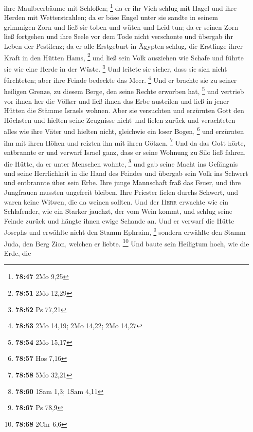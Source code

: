 ihre Maulbeerbäume mit Schloßen; \footnote{\textbf{78:47} 2Mo 9,25}
 da er ihr Vieh schlug mit Hagel und ihre Herden mit
Wetterstrahlen;  da er böse Engel unter sie sandte in
seinem grimmigen Zorn und ließ sie toben und wüten und Leid tun;
 da er seinen Zorn ließ fortgehen und ihre Seele vor dem
Tode nicht verschonte und übergab ihr Leben der Pestilenz;
 da er alle Erstgeburt in Ägypten schlug, die Erstlinge
ihrer Kraft in den Hütten Hams, \footnote{\textbf{78:51} 2Mo 12,29}
 und ließ sein Volk ausziehen wie Schafe und führte sie
wie eine Herde in der Wüste. \footnote{\textbf{78:52} Ps 77,21}
 Und leitete sie sicher, dass sie sich nicht fürchteten;
aber ihre Feinde bedeckte das Meer. \footnote{\textbf{78:53} 2Mo 14,19;
  2Mo 14,22; 2Mo 14,27}  Und er brachte sie zu seiner
heiligen Grenze, zu diesem Berge, den seine Rechte erworben hat,
\footnote{\textbf{78:54} 2Mo 15,17}  und vertrieb vor
ihnen her die Völker und ließ ihnen das Erbe austeilen und ließ in jener
Hütten die Stämme Israels wohnen.  Aber sie versuchten
und erzürnten Gott den Höchsten und hielten seine Zeugnisse nicht
 und fielen zurück und verachteten alles wie ihre Väter
und hielten nicht, gleichwie ein loser Bogen, \footnote{\textbf{78:57}
  Hos 7,16}  und erzürnten ihn mit ihren Höhen und
reizten ihn mit ihren Götzen. \footnote{\textbf{78:58} 5Mo 32,21}
 Und da das Gott hörte, entbrannte er und verwarf Israel
ganz,  dass er seine Wohnung zu Silo ließ fahren, die
Hütte, da er unter Menschen wohnte, \footnote{\textbf{78:60} 1Sam 1,3;
  1Sam 4,11}  und gab seine Macht ins Gefängnis und seine
Herrlichkeit in die Hand des Feindes  und übergab sein
Volk ins Schwert und entbrannte über sein Erbe.  Ihre
junge Mannschaft fraß das Feuer, und ihre Jungfrauen mussten ungefreit
bleiben.  Ihre Priester fielen durchs Schwert, und waren
keine Witwen, die da weinen sollten.  Und der
\textsc{Herr} erwachte wie ein Schlafender, wie ein Starker jauchzt, der
vom Wein kommt,  und schlug seine Feinde zurück und
hängte ihnen ewige Schande an.  Und er verwarf die Hütte
Josephs und erwählte nicht den Stamm Ephraim, \footnote{\textbf{78:67}
  Ps 78,9}  sondern erwählte den Stamm Juda, den Berg
Zion, welchen er liebte. \footnote{\textbf{78:68} 2Chr 6,6}
 Und baute sein Heiligtum hoch, wie die Erde, die
